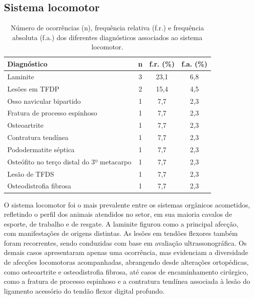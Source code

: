 \subsection{Sistema locomotor}
\label{subsec:locomotor}

\begin{table}[htb]
  \centering
  \caption{Número de ocorrências (n), frequência relativa (f.r.) e frequência absoluta (f.a.) dos diferentes diagnósticos associados ao sistema locomotor.}
  \label{tab:locomotor}
  \begin{tabular}{lccc}
    \toprule
    \textbf{Diagnóstico} & \textbf{n} & \textbf{f.r. (\%)} & \textbf{f.a. (\%)} \\
    \midrule
    Laminite                               & 3 & 23,1 & 6,8 \\
    Lesões em TFDP                         & 2 & 15,4 & 4,5 \\
    Osso navicular bipartido               & 1 & 7,7  & 2,3 \\
    Fratura de processo espinhoso          & 1 & 7,7  & 2,3 \\
    Osteoartrite                           & 1 & 7,7  & 2,3 \\
    Contratura tendínea                    & 1 & 7,7  & 2,3 \\
    Pododermatite séptica                  & 1 & 7,7  & 2,3 \\
    Osteófito no terço distal do 3º metacarpo & 1 & 7,7 & 2,3 \\
    Lesão de TFDS                          & 1 & 7,7  & 2,3 \\
    Osteodistrofia fibrosa                 & 1 & 7,7  & 2,3 \\
    \bottomrule
  \end{tabular}
\end{table}

O sistema locomotor foi o mais prevalente entre os sistemas orgânicos
acometidos, refletindo o perfil dos animais atendidos no setor, em sua
maioria cavalos de esporte, de trabalho e de resgate. A laminite figurou
como a principal afecção, com manifestações de origens distintas. As
lesões em tendões flexores também foram recorrentes, sendo conduzidas
com base em avaliação ultrassonográfica. Os demais casos apresentaram
apenas uma ocorrência, mas evidenciam a diversidade de afecções
locomotoras acompanhadas, abrangendo desde alterações ortopédicas, como
osteoartrite e osteodistrofia fibrosa, até casos de encaminhamento
cirúrgico, como a fratura de processo espinhoso e a contratura tendínea
associada à lesão do ligamento acessório do tendão flexor digital
profundo.

